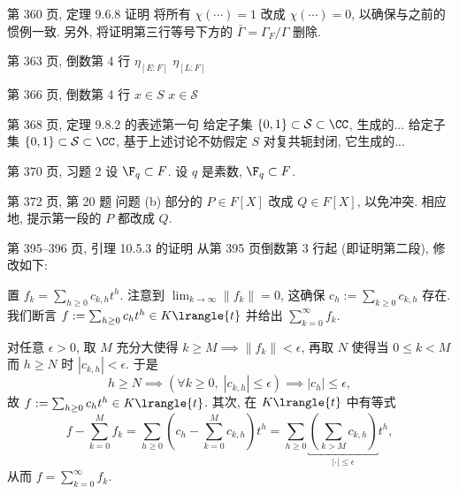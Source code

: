 \documentclass{AJerrata}
\begin{document}
\begin{Errata}
        \item[第 360 页, 定理 9.6.8 证明]
        将所有 $\chi(\cdots) = 1$ 改成 $\chi(\cdots) = 0$, 以确保与之前的惯例一致. 另外, 将证明第三行等号下方的 $\bar{\Gamma} = \Gamma_F/\Gamma$ 删除.
        
   		\item[第 363 页, 倒数第 4 行]
        \Orig $\eta_{[E:F]}$
        \Corr $\eta_{[L:F]}$
		
		\item[第 366 页, 倒数第 4 行]
		\Orig $x \in S$
		\Corr $x \in \mathcal{S}$
        
        \item[第 368 页, 定理 9.8.2 的表述第一句]
        \Orig 给定子集 $\{0, 1\} \subset \mathcal{S} \subset \CC$, 生成的...
        \Corr 给定子集 $\{0, 1\} \subset \mathcal{S} \subset \CC$, 基于上述讨论不妨假定 $S$ 对复共轭封闭, 它生成的...
        
        \item[第 370 页, 习题 2]
        \Orig 设 $\F_q \subset F$.
        \Corr 设 $q$ 是素数, $\F_q \subset F$.
        
   		\item[第 372 页, 第 20 题]
        问题 (b) 部分的 $P \in F[X]$ 改成 $Q \in F[X]$, 以免冲突. 相应地, 提示第一段的 $P$ 都改成 $Q$.
        
        \item[第 395--396 页, 引理 10.5.3 的证明]
        从第 395 页倒数第 3 行起 (即证明第二段), 修改如下:

		置 $f_k = \sum_{h \geq 0} c_{k,h} t^h$. 注意到 $\lim_{k \to \infty} \|f_k\| = 0$, 这确保 $c_h := \sum_{k \geq 0} c_{k,h}$ 存在. 我们断言 $f := \sum_{h \geq 0} c_h t^h \in K\lrangle{t}$ 并给出 $\sum_{k=0}^\infty f_k$.
        
        对任意 $\epsilon > 0$, 取 $M$ 充分大使得 $k \geq M \implies \|f_k\| < \epsilon$, 再取 $N$ 使得当 $0 \leq k < M$ 而 $h \geq N$ 时 $|c_{k,h}| < \epsilon$. 于是
        \[ h \geq N \implies \left( \forall k \geq 0, \; |c_{k,h}| \leq \epsilon \right) \implies |c_h| \leq \epsilon, \]
        故 $f := \sum_{h \geq 0} c_h t^h \in K\lrangle{t}$. 其次, 在 $K\lrangle{t}$ 中有等式
        \[ f - \sum_{k=0}^M f_k = \sum_{h \geq 0} \left( c_h - \sum_{k=0}^M c_{k,h} \right) t^h = \sum_{h \geq 0} \underbracket{ \left( \sum_{k > M} c_{k,h} \right)}_{|\cdot| \leq \epsilon} t^h , \]
        从而 $f = \sum_{k=0}^\infty f_k$.
        

\end{Errata}
\end{document}
